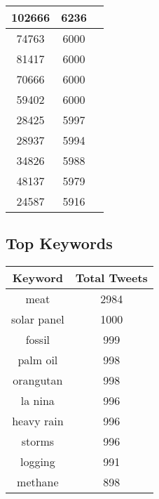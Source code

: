 \documentclass{article}\usepackage[T1]{fontenc}
\begin{document}
\begin{tabular}{|c|c|c|}
 \hline
102666 & 6236\\ 
 \hline
74763 & 6000\\ 
 \hline
81417 & 6000\\ 
 \hline
70666 & 6000\\ 
 \hline
59402 & 6000\\ 
 \hline
28425 & 5997\\ 
 \hline
28937 & 5994\\ 
 \hline
34826 & 5988\\ 
 \hline
48137 & 5979\\ 
 \hline
24587 & 5916\\ 
 \hline
\end{tabular}\subsection*{Top Keywords}\begin{tabular}{|c|c|}         \hline         Keyword & Total Tweets \\ 
 \hline
meat & 2984\\ 
 \hline
solar panel & 1000\\ 
 \hline
fossil & 999\\ 
 \hline
palm oil & 998\\ 
 \hline
orangutan & 998\\ 
 \hline
la nina & 996\\ 
 \hline
heavy rain & 996\\ 
 \hline
storms & 996\\ 
 \hline
logging & 991\\ 
 \hline
methane & 898\\ 
 \hline
\end{tabular}
\end{document}
